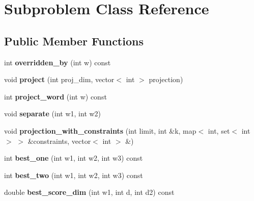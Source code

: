 \hypertarget{class_subproblem}{
\section{Subproblem Class Reference}
\label{class_subproblem}
}
\subsection*{Public Member Functions}
\begin{DoxyCompactItemize}
\item 
\hypertarget{class_subproblem_a1f76e6e7b079168299046c42e484c9cf}{
int {\bfseries overridden\_\-by} (int w) const }
\label{class_subproblem_a1f76e6e7b079168299046c42e484c9cf}

\item 
\hypertarget{class_subproblem_aba36ea76049a46e9ba1f0ac3ccec540a}{
void {\bfseries project} (int proj\_\-dim, vector$<$ int $>$ projection)}
\label{class_subproblem_aba36ea76049a46e9ba1f0ac3ccec540a}

\item 
\hypertarget{class_subproblem_a7c86b92cc388505602707376e52a0804}{
int {\bfseries project\_\-word} (int w) const }
\label{class_subproblem_a7c86b92cc388505602707376e52a0804}

\item 
\hypertarget{class_subproblem_a3f6d78f4567e70c35785d27a53a55490}{
void {\bfseries separate} (int w1, int w2)}
\label{class_subproblem_a3f6d78f4567e70c35785d27a53a55490}

\item 
\hypertarget{class_subproblem_a503126c48810484433fd6c3e428f6537}{
void {\bfseries projection\_\-with\_\-constraints} (int limit, int \&k, map$<$ int, set$<$ int $>$ $>$ \&constraints, vector$<$ int $>$ \&)}
\label{class_subproblem_a503126c48810484433fd6c3e428f6537}

\item 
\hypertarget{class_subproblem_a4c12e798de9d3e96d6935bd755f92a97}{
int {\bfseries best\_\-one} (int w1, int w2, int w3) const }
\label{class_subproblem_a4c12e798de9d3e96d6935bd755f92a97}

\item 
\hypertarget{class_subproblem_abf452bcac2a8a28adbdbffe402e64dde}{
int {\bfseries best\_\-two} (int w1, int w2, int w3) const }
\label{class_subproblem_abf452bcac2a8a28adbdbffe402e64dde}

\item 
\hypertarget{class_subproblem_a80e4996ec87d5c3501ef10abdd953260}{
double {\bfseries best\_\-score\_\-dim} (int w1, int d, int d2) const }
\label{class_subproblem_a80e4996ec87d5c3501ef10abdd953260}


\end{DoxyCompactItemize}
